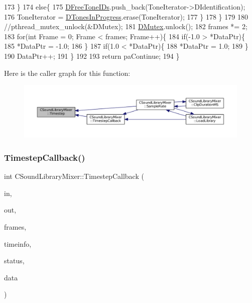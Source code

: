 \begin{DoxyCode}
173         \}
174         \textcolor{keywordflow}{else}\{
175             \hyperlink{classCSoundLibraryMixer_a2d1389368651db10fd6fd8b3cd08c164}{DFreeToneIDs}.push\_back(ToneIterator->DIdentification);   
176             ToneIterator = \hyperlink{classCSoundLibraryMixer_a39bb9c811d842a282b6b7058ac7dfe1c}{DTonesInProgress}.erase(ToneIterator);
177         \}
178     \}
179     
180     \textcolor{comment}{//pthread\_mutex\_unlock(&DMutex);    }
181     \hyperlink{classCSoundLibraryMixer_a955562a0638df831413a1c6b8860f9fb}{DMutex}.unlock();
182     frames *= 2;
183     \textcolor{keywordflow}{for}(\textcolor{keywordtype}{int} Frame = 0; Frame < frames; Frame++)\{
184         \textcolor{keywordflow}{if}(-1.0 > *DataPtr)\{
185             *DataPtr = -1.0;
186         \}
187         \textcolor{keywordflow}{if}(1.0 < *DataPtr)\{
188             *DataPtr = 1.0;
189         \}
190         DataPtr++;
191     \}
192     
193     \textcolor{keywordflow}{return} paContinue;
194 \}
\end{DoxyCode}
Here is the caller graph for this function\+:\nopagebreak
\begin{figure}[H]
\begin{center}
\leavevmode
\includegraphics[width=350pt]{classCSoundLibraryMixer_ad3ef0b67b77862e8c88949c3415095e7_icgraph}
\end{center}
\end{figure}
\hypertarget{classCSoundLibraryMixer_a1d04553aa93769b8bff4bb5c8b7bdfa1}{}\label{classCSoundLibraryMixer_a1d04553aa93769b8bff4bb5c8b7bdfa1} 
\subsubsection{\texorpdfstring{Timestep\+Callback()}{TimestepCallback()}}
{\footnotesize\ttfamily int C\+Sound\+Library\+Mixer\+::\+Timestep\+Callback (\begin{DoxyParamCaption}\item[{const void $\ast$}]{in,  }\item[{void $\ast$}]{out,  }\item[{unsigned long}]{frames,  }\item[{const Pa\+Stream\+Callback\+Time\+Info $\ast$}]{timeinfo,  }\item[{Pa\+Stream\+Callback\+Flags}]{status,  }\item[{void $\ast$}]{data }\end{DoxyParamCaption})\hspace{0.3cm}{\ttfamily [static]}}



